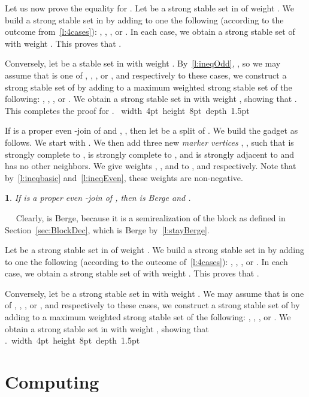 \documentclass[11 pt] {article}
\newcommand\blackslug{\hbox{\hskip 1pt \vrule width 4pt height 8pt depth 1.5pt
        \hskip 1pt}}
\newcommand\bbox{\hfill \quad \blackslug \medbreak}
\newtheorem{lemma}[theorem]{}
\newcounter{claim}
\newcommand{\Proof}{\setcounter{claim}{0}\noindent{\bf Proof.}\ \ }
\begin{document}
Let us now prove the equality for .  Let  be a strong
stable set in  of weight .  We build a strong stable set
in  by adding to  one the following (according
to the outcome from~\ref{l:4cases}): , , , or
.  In each case, we obtain a strong stable set of  with weight .  This proves that .

Conversely, let  be a stable set in  with weight
.  By~\ref{l:ineqOdd}, , so we may assume that 
is one of , , , or , and
respectively to these cases, we construct a strong stable set of 
by adding to  a maximum weighted strong stable set of the
following: , , , or
.  We obtain a strong stable set in  with weight
, showing that . This completes the proof for .
\bbox


If  is a proper even -join of  and , ,
then let  be a split of . We
build the gadget  as follows.  We start with
.  We then add three new \emph{marker vertices} , , 
such that  is strongly complete to ,  is strongly complete
to , and  is strongly adjacent to  and has no other
neighbors.  We give weights , , and  to ,  and  respectively.  Note that
by~\ref{l:ineqbasic} and~\ref{l:ineqEven}, these weights are non-negative.

\begin{lemma}
  \label{l:evenblock4}
  If  is a proper even -join of , then  is
  Berge and .
\end{lemma}
\Proof 
Clearly,  is Berge, because it is a semirealization of the
block  as defined in Section~\ref{sec:BlockDec}, which is Berge
by~\ref{l:stayBerge}.  

Let  be a strong stable set in  of weight .
We build a strong stable set in  by adding to 
one the following (according to the outcome of~\ref{l:4cases}):
, , , or .  In each case, we obtain a
strong stable set of  with weight .  This proves that .

Conversely, let  be a strong stable set in  with weight
.  We may assume that  is one of
, , , or , and respectively to these
cases, we construct a strong stable set of  by adding to  a maximum weighted strong stable set of the following: , , , or .  We obtain a
strong stable set in  with weight , showing that .\bbox

\section{Computing }
\label{sec:computeAlpha}
\end{document}
